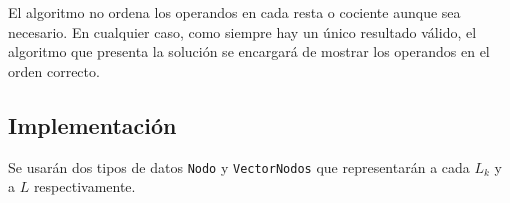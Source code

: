 El algoritmo no ordena los operandos en cada resta o cociente aunque sea necesario.
En cualquier caso, como siempre hay un único resultado válido, el algoritmo que
presenta la solución se encargará de mostrar los operandos en el orden correcto.

\subsection{Implementación}

Se usarán dos tipos de datos \texttt{Nodo} y \texttt{VectorNodos} que representarán a cada $L_k$ y a $L$ respectivamente.


